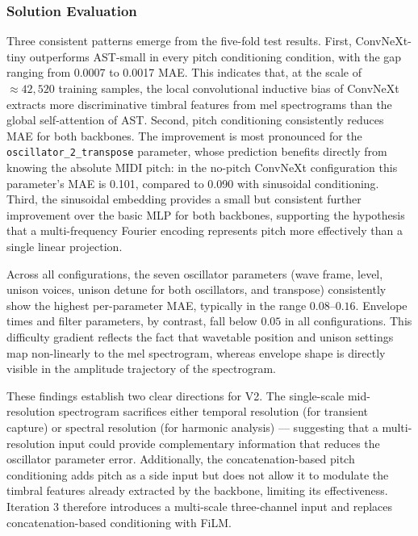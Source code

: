 \subsubsection{Solution Evaluation}

\noindent
Three consistent patterns emerge from the five-fold test results. First, ConvNeXt-tiny outperforms AST-small in every pitch conditioning condition, with the gap ranging from 0.0007 to 0.0017 MAE. This indicates that, at the scale of $\approx 42{,}520$ training samples, the local convolutional inductive bias of ConvNeXt extracts more discriminative timbral features from mel spectrograms than the global self-attention of AST. Second, pitch conditioning consistently reduces MAE for both backbones. The improvement is most pronounced for the \texttt{oscillator\_2\_transpose} parameter, whose prediction benefits directly from knowing the absolute MIDI pitch: in the no-pitch ConvNeXt configuration this parameter's MAE is 0.101, compared to 0.090 with sinusoidal conditioning. Third, the sinusoidal embedding provides a small but consistent further improvement over the basic MLP for both backbones, supporting the hypothesis that a multi-frequency Fourier encoding represents pitch more effectively than a single linear projection.

\noindent \newline
Across all configurations, the seven oscillator parameters (wave frame, level, unison voices, unison detune for both oscillators, and transpose) consistently show the highest per-parameter MAE, typically in the range $0.08$–$0.16$. Envelope times and filter parameters, by contrast, fall below $0.05$ in all configurations. This difficulty gradient reflects the fact that wavetable position and unison settings map non-linearly to the mel spectrogram, whereas envelope shape is directly visible in the amplitude trajectory of the spectrogram.

\noindent \newline
These findings establish two clear directions for V2. The single-scale mid-resolution spectrogram sacrifices either temporal resolution (for transient capture) or spectral resolution (for harmonic analysis) — suggesting that a multi-resolution input could provide complementary information that reduces the oscillator parameter error. Additionally, the concatenation-based pitch conditioning adds pitch as a side input but does not allow it to modulate the timbral features already extracted by the backbone, limiting its effectiveness. Iteration 3 therefore introduces a multi-scale three-channel input and replaces concatenation-based conditioning with FiLM.


